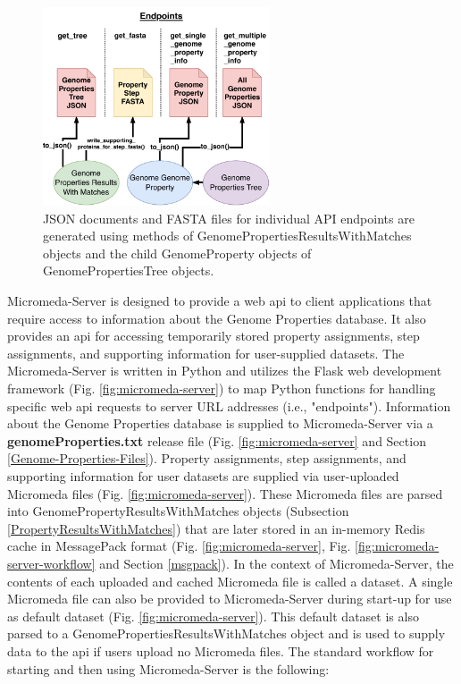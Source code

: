 \begin{figure}[!ht]
  \centering
	\includegraphics[width=0.60\textwidth]{media/Micromeda-Endpoints.pdf}
	 \caption{JSON documents and FASTA files for individual API endpoints are generated using methods of GenomePropertiesResultsWithMatches objects and the child GenomeProperty objects of GenomePropertiesTree objects.}
	 \label{fig:micromeda-endpoints}
\end{figure}

Micromeda-Server is designed to provide a web \gls{api} to client applications that require access to information about the Genome Properties database. It also provides an \gls{api} for accessing temporarily stored property assignments, step assignments, and supporting information for user-supplied datasets. The Micromeda-Server is written in Python and utilizes the Flask web development framework \cite{grinberg2018flask} (Fig. \ref{fig:micromeda-server}) to map Python functions for handling specific web \gls{api} requests to server URL addresses (i.e., "endpoints"). Information about the Genome Properties database is supplied to Micromeda-Server via a \textbf{genomeProperties.txt} release file (Fig. \ref{fig:micromeda-server} and Section \ref{Genome-Properties-Files}). Property assignments, step assignments, and supporting information for user datasets are supplied via user-uploaded Micromeda files (Fig. \ref{fig:micromeda-server}). These Micromeda files are parsed into GenomePropertyResultsWithMatches objects (Subsection \ref{PropertyResultsWithMatches}) that are later stored in an in-memory Redis cache \cite{han2011survey} in MessagePack format \cite{furuhashi2013messagepack} (Fig. \ref{fig:micromeda-server}, Fig. \ref{fig:micromeda-server-workflow} and Section \ref{msgpack}). In the context of Micromeda-Server, the contents of each uploaded and cached Micromeda file is called a dataset. A single Micromeda file can also be provided to Micromeda-Server during start-up for use as default dataset (Fig. \ref{fig:micromeda-server}). This default dataset is also parsed to a GenomePropertiesResultsWithMatches object and is used to supply data to the \gls{api} if users upload no Micromeda files. The standard workflow for starting and then using Micromeda-Server is the following:

